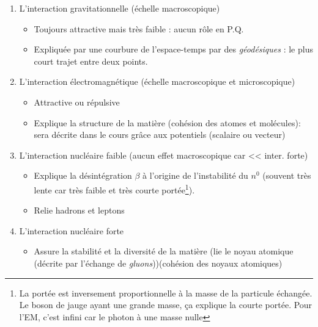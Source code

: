 \documentclass	[11pt, a4paper, openany]{book}
\begin{document}
	\begin{enumerate}
		\item L'interaction gravitationnelle (échelle macroscopique)
		      \begin{itemize}
		      	\item Toujours attractive mais très faible : aucun rôle en P.Q.
		      	\item Expliquée par une courbure de l'espace-temps par des \textit{géodésiques} : le plus court trajet entre deux points.
		      \end{itemize}
		\item L'interaction électromagnétique (échelle macroscopique et microscopique)
		      \begin{itemize}
		      	\item Attractive ou répulsive
		      	\item Explique la structure de la matière (cohésion des atomes et molécules): sera décrite dans le cours grâce aux potentiels (scalaire ou vecteur)
		      \end{itemize}
		\item L'interaction nucléaire faible (aucun effet macroscopique car << inter. forte)
		      \begin{itemize}
		      	\item Explique la désintégration $\beta$ à l'origine de l'instabilité du $n^0$ (souvent très lente car très faible et très courte portée\footnote{La portée est inversement proportionnelle à la masse de la particule échangée. Le boson de jauge ayant une grande masse, ça explique la courte portée. Pour l'EM, c'est infini car le photon à une masse nulle}).
		      	\item Relie hadrons et leptons
		      \end{itemize}
		\item L'interaction nucléaire forte
		      \begin{itemize}
		      	
		      	\item Assure la stabilité et la diversité de la matière (lie le noyau atomique (décrite par l'échange de \textit{gluons}))(cohésion des noyaux atomiques)
		      \end{itemize}
	\end{enumerate}
	
\end{document}
